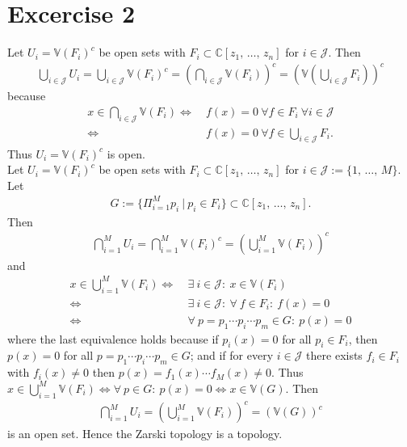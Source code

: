 \documentclass{article}
\begin{document}
\section*{Excercise 2}
\label{sec:Ex2}
Let $U_{i} = \mathbb{V}(F_{i})^{c}$ be open sets with $F_{i} \subset \mathbb{C}\left[z_{1} ,\, \dots ,\, z_{n}\right]$ for $i \in \mathcal{J}$.
Then
\begin{align*}
 \bigcup_{i \in \mathcal{J}} U_{i} = \bigcup_{i \in \mathcal{J}} \mathbb{V}(F_{i})^{c} = \left(\bigcap_{i \in \mathcal{J}} \mathbb{V}(F_{i})\right)^{c} = \left( \mathbb{V} \left( \bigcup_{i \in \mathcal{J}} F_{i} \right)\right)^{c}
\end{align*}
because
\begin{align*}
  x \in \bigcap_{i \in \mathcal{J}} \mathbb{V}(F_{i})
  \Leftrightarrow \ & f(x) = 0 \ \forall f \in F_{i} \ \forall i \in \mathcal{J} \\
  \Leftrightarrow \ & f(x) = 0 \ \forall f \in \bigcup_{i \in \mathcal{J}} F_{i}.  
\end{align*}
Thus $U_{i} = \mathbb{V}(F_{i})^{c}$ is open.\\
Let $U_{i} = \mathbb{V}(F_{i})^{c}$ be open sets with $F_{i} \subset \mathbb{C}\left[z_{1} ,\, \dots ,\, z_{n}\right]$ for $i \in \mathcal{J} := \{ 1 ,\, \dots ,\, M\}$.
Let
\begin{align*}
 G := \{ \Pi_{i = 1}^{M} p_{i} \ | \ p_{i} \in F_{i}\} \subset \mathbb{C}\left[z_{1} ,\, \dots ,\, z_{n}\right].
\end{align*}
Then
\begin{align*}
  \bigcap_{i=1}^{M} U_{i} = \bigcap_{i=1}^{M} \mathbb{V}(F_{i})^{c} =  \left(\bigcup_{i=1}^{M} \mathbb{V}(F_{i})\right)^{c}
\end{align*}
and
\begin{align*}
  x \in \bigcup_{i=1}^{M} \mathbb{V}(F_{i})
  \Leftrightarrow \ & \exists \ i \in \mathcal{J}: \ x \in \mathbb{V}(F_{i}) \\
  \Leftrightarrow \ & \exists \ i \in \mathcal{J}: \ \forall \ f \in F_{i}: \ f(x) = 0 \\
  \Leftrightarrow \ & \forall \ p = p_{1} \cdots p_{i} \cdots p_{m} \in G: \ p(x) = 0
\end{align*}
where the last equivalence holds because if $p_{i}(x) = 0$ for all $p_{i} \in F_{i}$, then $p(x) = 0$ for all $p = p_{1} \cdots p_{i} \cdots p_{m}\in G$; and if for every $i \in \mathcal{J}$ there exists $f_{i} \in F_{i}$ with $f_{i}(x) \neq 0$ then $p(x) = f_{1}(x) \cdots f_{M}(x) \neq 0$.
Thus $x \in \bigcup_{i=1}^{M} \mathbb{V}(F_{i}) \Leftrightarrow \forall \ p \in G: \ p(x) = 0 \Leftrightarrow x \in \mathbb{V}(G)$.
Then
\begin{align*}
  \bigcap_{i=1}^{M} U_{i} = \left(\bigcup_{i=1}^{M} \mathbb{V}(F_{i})\right)^{c} = \left(\mathbb{V}(G)\right)^{c}
\end{align*}
is an open set.
Hence the Zarski topology is a topology.
\end{document}
